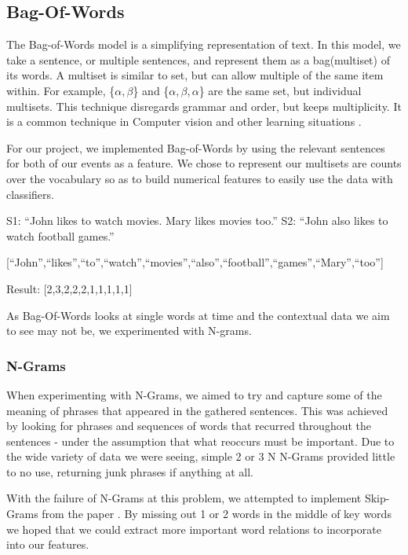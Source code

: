 \documentclass[bsc,frontabs,twoside,singlespacing,parskip,deptreport]{infthesis}     %
\begin{document}
\subsection{Bag-Of-Words}
The Bag-of-Words model is a simplifying representation of text.
In this model, we take a sentence, or multiple sentences, and represent them as a bag(multiset) of its words.
A multiset is similar to set, but can allow multiple of the same item within.
For example, \{$\alpha,\beta$\} and \{$\alpha,\beta,\alpha$\} are the same set, but individual multisets.
This technique disregards grammar and order, but keeps multiplicity. It is a common technique in Computer vision
and other learning situations \cite{}.

For our project, we implemented Bag-of-Words by using the relevant sentences for both of our events as a feature.
We chose to represent our multisets are counts over the vocabulary so as to build numerical features to easily
use the data with classifiers.

S1: ``John likes to watch movies. Mary likes movies too.''
S2: ``John also likes to watch football games.''

[``John'',``likes'',``to'',``watch'',``movies'',``also'',``football'',``games'',``Mary'',``too'']

Result: [2,3,2,2,2,1,1,1,1,1]

As Bag-Of-Words looks at single words at time and the contextual data we aim to see may not be, we experimented with
N-grams.

\subsubsection{N-Grams}
When experimenting with N-Grams, we aimed to try and capture some of the meaning of phrases that appeared in the gathered
sentences.
This was achieved by looking for phrases and sequences of words that recurred throughout the sentences - under the assumption
that what reoccurs must be important. Due to the wide variety of data we were seeing, simple 2 or 3 N N-Grams provided
little to no use, returning junk phrases if anything at all.

With the failure of N-Grams at this problem, we attempted to implement Skip-Grams from the paper \cite{guthrie2006closer}.
By missing out 1 or 2 words in the middle of key words we hoped that we could extract more important word relations to
incorporate into our features.
\end{document}
